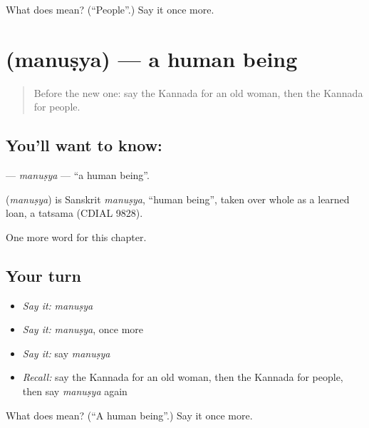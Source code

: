\begin{tcolorbox}[breakable,colback=teal!4,colframe=teal!35!black,title={Before you move on}]
What does  mean? (\textquotedblleft{}People\textquotedblright{}.) Say it once more.
\end{tcolorbox}
\section[\texorpdfstring{\kn{ಮನುಷ್ಯ} (manuṣya)}{ಮನುಷ್ಯ (manuṣya)}]{ (manuṣya) — a human being}

\label{lesson:KA-C299-manusya}



\begin{quote}
Before the new one: say the Kannada for an old woman, then the Kannada for people.
\end{quote}

\subsection*{You'll want to know: }
\textbf{} — \emph{manuṣya} — \textquotedblleft{}a human being\textquotedblright{}.

\begin{cousinweb}
\textbf{} (\emph{manuṣya}) is Sanskrit \emph{manuṣya}, \textquotedblleft{}human being\textquotedblright{}, taken over whole as a learned loan, a tatsama (CDIAL 9828).
\end{cousinweb}

\begin{grammarlens}[title={What you've built}]
One more word for this chapter.
\end{grammarlens}

\subsection*{Your turn}
\begin{itemize}
\raggedright
  \item \emph{Say it:} \emph{manuṣya}
  \item \emph{Say it:} \emph{manuṣya}, once more
  \item \emph{Say it:} say \emph{manuṣya}
  \item \emph{Recall:} say the Kannada for an old woman, then the Kannada for people, then say \emph{manuṣya} again
\end{itemize}

\begin{tcolorbox}[breakable,colback=teal!4,colframe=teal!35!black,title={Before you move on}]
What does  mean? (\textquotedblleft{}A human being\textquotedblright{}.) Say it once more.
\end{tcolorbox}
